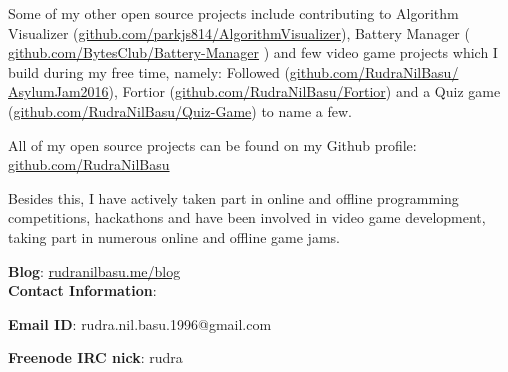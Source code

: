\documentclass[preprint,12pt]{elsarticle}
\begin{document}
Some of my other open source projects include contributing to Algorithm Visualizer (\href{https://github.com/parkjs814/AlgorithmVisualizer}{github.com/parkjs814/AlgorithmVisualizer}), Battery Manager ( \href{https://github.com/BytesClub/Battery_Manager}{github.com/BytesClub/Battery-Manager} ) and few video game projects which I build during my free time, namely: Followed (\href{https://github.com/RudraNilBasu/AsylumJam2016}{github.com/RudraNilBasu/\\AsylumJam2016}), Fortior (\href{https://github.com/RudraNilBasu/Fortior}{github.com/RudraNilBasu/Fortior}) and a Quiz game (\href{https://github.com/RudraNilBasu/Quiz-Game}{github.com/RudraNilBasu/Quiz-Game}) to name a few.

All of my open source projects can be found on my Github profile: \href{https://github.com/RudraNilBasu}{github.com/RudraNilBasu}


Besides this, I have actively taken part in online and offline programming competitions, hackathons and have been involved in video game development, taking part in numerous online and offline game jams.

\textbf{Blog}: \href{http://rudranilbasu.me/blog/}{rudranilbasu.me/blog}\\

\textbf{Contact Information}:

\textbf{Email ID}: rudra.nil.basu.1996@gmail.com

\textbf{Freenode IRC nick}: rudra













\end{document}
